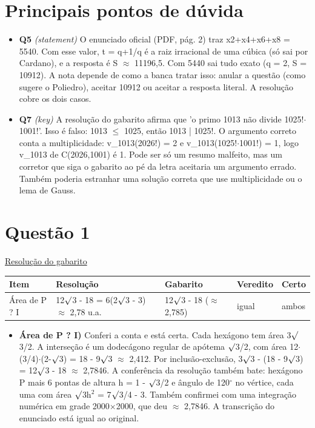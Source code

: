 \documentclass{article}%
\begin{document}
\section*{Principais pontos de dúvida}%
\begin{itemize}%
\item%
\textbf{Q5} \textit{(statement)} O enunciado oficial (PDF, pág. 2) traz x2+x4+x6+x8 = 5540. Com esse valor, t = q+1/q é a raiz irracional de uma cúbica (só sai por Cardano), e a resposta é S $\approx$ 11196,5. Com 5440 sai tudo exato (q = 2, S = 10912). A nota depende de como a banca tratar isso: anular a questão (como sugere o Poliedro), aceitar 10912 ou aceitar a resposta literal. A resolução cobre os dois casos.%
\item%
\textbf{Q7} \textit{(key)} A resolução do gabarito afirma que 'o primo 1013 não divide 1025!$\cdot$1001!'. Isso é falso: 1013 $\leq$ 1025, então 1013 | 1025!. O argumento correto conta a multiplicidade: v\_1013(2026!) = 2 e v\_1013(1025!$\cdot$1001!) = 1, logo v\_1013 de C(2026,1001) é 1. Pode ser só um resumo malfeito, mas um corretor que siga o gabarito ao pé da letra aceitaria um argumento errado. Também poderia estranhar uma solução correta que use multiplicidade ou o lema de Gauss.%
\end{itemize}%
\section*{Questão 1}%
\href{https://poliedroresolve.sistemapoliedro.com.br/vestibulares/ime/2027/ime-2-fase-dia-1-26-10-2026-2-fase-dia-1/dissertativa-1-matematica-2-fase-dia-1-ime-2027}{Resolução do gabarito}\par\smallskip%
\begin{longtable}{@{}p{} p{} p{} p{} p{}@{}}\toprule Item & Resolução & Gabarito & Veredito & Certo \\ \midrule
Área de P ? I & 12$\surd$3 - 18 = 6(2$\surd$3 - 3) $\approx$ 2,78 u.a. & 12$\surd$3 - 18 ($\approx$ 2,785) & igual & ambos \\
\bottomrule\end{longtable}%
\begin{itemize}%
\item%
\textbf{Área de P ? I)} Conferi a conta e está certa. Cada hexágono tem área 3$\surd$3/2. A interseção é um dodecágono regular de apótema $\surd$3/2, com área 12$\cdot$(3/4)$\cdot$(2-$\surd$3) = 18 - 9$\surd$3 $\approx$ 2,412. Por inclusão{-}exclusão, 3$\surd$3 - (18 - 9$\surd$3) = 12$\surd$3 - 18 $\approx$ 2,7846. A conferência da resolução também bate: hexágono P mais 6 pontas de altura h = 1 - $\surd$3/2 e ângulo de 120$^\circ$ no vértice, cada uma com área $\surd$3h$^2$ = 7$\surd$3/4 - 3. Também confirmei com uma integração numérica em grade 2000$\times$2000, que deu $\approx$ 2,7846. A transcrição do enunciado está igual ao original.%
\end{itemize}%
\end{document}
